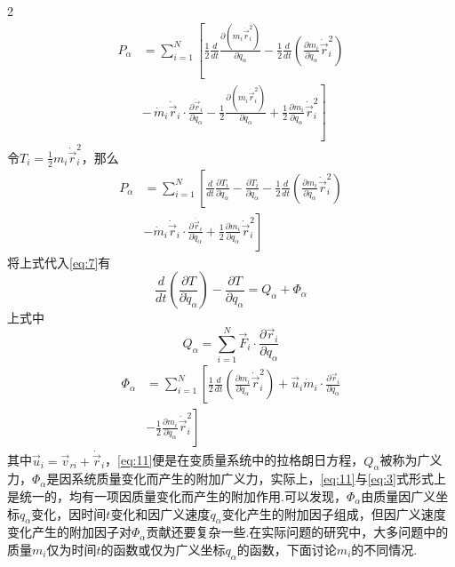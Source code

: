 \documentclass[12pt,twoside]{article}
\numberwithin{equation}{section}    %
\begin{document}
\begin{multicols}{2}
    \[
        \begin{split}
            P_{\alpha} &= \sum_{i=1}^N \left[ \frac{1}{2}\frac{d}{dt}\frac{\partial (m_i\dot{\vec{r}}_i^2)}{\partial \dot{q}_{\alpha}}
            - \frac{1}{2}\frac{d}{dt}\left( \frac{\partial m_i}{\partial \dot{q}_{\alpha}}\dot{\vec{r}}_i^2 \right) \right. 
            \\
            & \left. -\, \dot{m}_i\dot{\vec{r}}_i\cdot \frac{\partial \dot{\vec{r}}_i}{\partial \dot{q}_{\alpha}}- \frac{1}{2}\frac{\partial (m_i\dot{\vec{r}}_i^2)}{\partial q_{\alpha}}+ \frac{1}{2}\frac{\partial m_i}{\partial q_{\alpha}}\dot{\vec{r}}_i^2 \right]
        \end{split}
    \]
    令$T_i=\frac{1}{2}m_i\dot{\vec{r}}_{i}^{2}$，那么
    \[
        \begin{split}
            P_{\alpha} &= \sum_{i=1}^N{\left[ \frac{d}{dt}\frac{\partial T_i}{\partial \dot{q}_{\alpha}}-\frac{\partial T_i}{\partial q_{\alpha}}-\frac{1}{2}\frac{d}{dt}\left( \frac{\partial m_i}{\partial \dot{q}_{\alpha}}\dot{\vec{r}}_{i}^{2} \right) \right.}
            \\
            & \left. -\dot{m}_i\dot{\vec{r}}_i\cdot \frac{\partial \dot{\vec{r}}_i}{\partial \dot{q}_{\alpha}}+\frac{1}{2}\frac{\partial m_i}{\partial q_{\alpha}}\dot{\vec{r}}_{i}^{2} \right] 
        \end{split}
    \]
    将上式代入\eqref{eq:7}有
    \begin{equation}
        \frac{d}{dt}\left( \frac{\partial T}{\partial \dot{q}_{\alpha}} \right) -\frac{\partial T}{\partial q_{\alpha}}=Q_{\alpha}+\varPhi _{\alpha}
        \label{eq:11}
    \end{equation}
    上式中
    \[
        Q_{\alpha}=\sum_{i=1}^N{\vec{F}_i\cdot \frac{\partial \vec{r}_i}{\partial q_{\alpha}}}
    \]
    \[
        \begin{split}
            \varPhi_{\alpha} &= \sum_{i=1}^N \left[ \frac{1}{2}\frac{d}{dt}\left( \frac{\partial m_i}{\partial \dot{q}_{\alpha}}\dot{\vec{r}}_{i}^{2} \right) + \vec{u}_i\dot{m}_i\cdot \frac{\partial \vec{r}_i}{\partial q_{\alpha}} \right. 
            \\
            & \left. - \frac{1}{2}\frac{\partial m_i}{\partial q_{\alpha}}\dot{\vec{r}}_{i}^{2} \right]
        \end{split}
    \]
    其中$\vec{u}_i=\vec{v}_{ri}+\dot{\vec{r}}_i$，\eqref{eq:11}便是在变质量系统中的拉格朗日方程，$Q_{\alpha}$被称为广义力，$\varPhi _{\alpha}$是因系统质量变化而产生的附加广义力，实际上，\eqref{eq:11}与\eqref{eq:3}式形式上是统一的，均有一项因质量变化而产生的附加作用.可以发现，$\varPhi _{\alpha}$由质量因广义坐标$q_{\alpha}$变化，因时间$t$变化和因广义速度$\dot{q}_{\alpha}$变化产生的附加因子组成，但因广义速度变化产生的附加因子对$\varPhi _{\alpha}$贡献还要复杂一些.在实际问题的研究中，大多问题中的质量$m_i$仅为时间$t$的函数或仅为广义坐标$q_{\alpha}$的函数，下面讨论$m_i$的不同情况.


\end{multicols}
\end{document}
